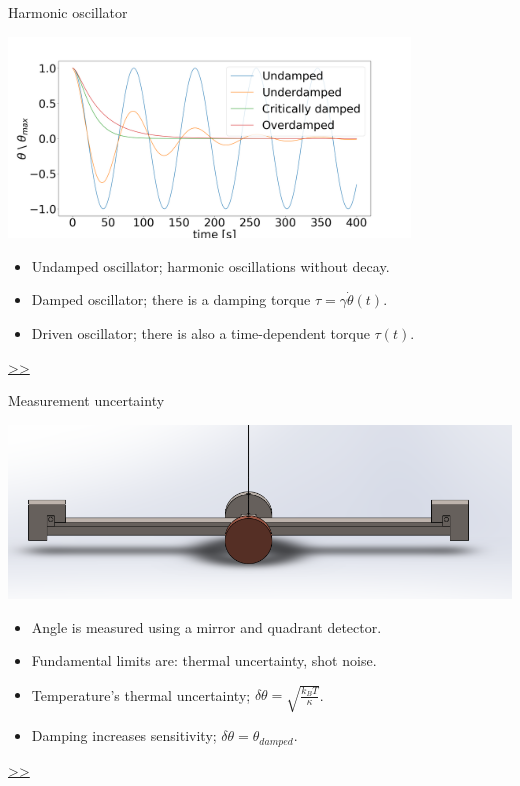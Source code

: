 \documentclass{beamer}
\begin{document}
\begin{frame}{\hypertarget{frame:Harmonic oscillator}{Harmonic oscillator}}
	\begin{center}		
		\includegraphics[width=0.8\textwidth,keepaspectratio]{damp.png}
    \end{center}
	\begin{itemize}

		\item Undamped oscillator; harmonic oscillations without decay.
		\item Damped oscillator; there is a damping torque $\tau = \gamma\dot{\theta}(t)$.
		\item Driven oscillator; there is also a time-dependent torque $\tau(t)$.
		
	\end{itemize}
	\hyperlink{frame:Damped oscillator}{>>}
\end{frame}


\begin{frame}{\hypertarget{frame:Measurement uncertainty}{Measurement uncertainty}}
	\begin{center}		
		\includegraphics[width=1\textwidth,keepaspectratio]{pendulum_front.png}
    \end{center}
	\begin{itemize}
		
		\item Angle is measured using a mirror and quadrant detector.
		\item Fundamental limits are: thermal uncertainty, shot noise. 
		\item Temperature’s thermal uncertainty; $\delta\theta = \sqrt{\frac{k_B T}{\kappa}}$. 
		\item Damping increases sensitivity; $  \delta\theta =  \theta_{damped}$.

		
	\end{itemize}
	\hyperlink{frame:Measurement uncertainty 1}{>>} 
\end{frame}
\end{document}
